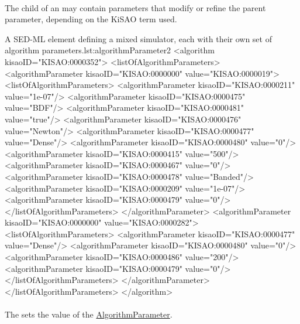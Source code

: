 \begin{blockChanged}
\paragraph*{}
The child  of an \AlgorithmParameter may contain parameters that modify or refine the parent parameter, depending on the KiSAO term used.  

\begin{myXmlLst}{A SED-ML  element defining a mixed simulator, each with their own set of algorithm parameters.}{lst:algorithmParameter2}
<algorithm kisaoID="KISAO:0000352">
    <listOfAlgorithmParameters>
        <algorithmParameter kisaoID="KISAO:0000000" value="KISAO:0000019">
            <listOfAlgorithmParameters>
                <algorithmParameter kisaoID="KISAO:0000211" value="1e-07"/>
                <algorithmParameter kisaoID="KISAO:0000475" value="BDF"/>
                <algorithmParameter kisaoID="KISAO:0000481" value="true"/>
                <algorithmParameter kisaoID="KISAO:0000476" value="Newton"/>
                <algorithmParameter kisaoID="KISAO:0000477" value="Dense"/>
                <algorithmParameter kisaoID="KISAO:0000480" value="0"/>
                <algorithmParameter kisaoID="KISAO:0000415" value="500"/>
                <algorithmParameter kisaoID="KISAO:0000467" value="0"/>
                <algorithmParameter kisaoID="KISAO:0000478" value="Banded"/>
                <algorithmParameter kisaoID="KISAO:0000209" value="1e-07"/>
                <algorithmParameter kisaoID="KISAO:0000479" value="0"/>
            </listOfAlgorithmParameters>
        </algorithmParameter>
        <algorithmParameter kisaoID="KISAO:0000000" value="KISAO:0000282">
            <listOfAlgorithmParameters>
                <algorithmParameter kisaoID="KISAO:0000477" value="Dense"/>
                <algorithmParameter kisaoID="KISAO:0000480" value="0"/>
                <algorithmParameter kisaoID="KISAO:0000486" value="200"/>
                <algorithmParameter kisaoID="KISAO:0000479" value="0"/>
            </listOfAlgorithmParameters>
        </algorithmParameter>
    </listOfAlgorithmParameters>
</algorithm>
\end{myXmlLst}


\end{blockChanged}


\paragraph*{}
\label{sec:algorithmParameterValue}
The  sets the value of the \hyperref[class:algorithmParameter]{AlgorithmParameter}.

